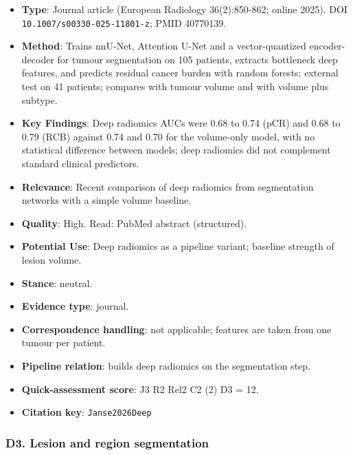 \documentclass[journal,onecolumn]{IEEEtran}
\begin{document}
\begin{itemize}

\item{} \textbf{Type}: Journal article (European Radiology 36(2):850-862; online 2025). DOI \nolinkurl{10.1007/s00330-025-11801-z}; PMID 40770139.

\item{} \textbf{Method}: Trains nnU-Net, Attention U-Net and a vector-quantized encoder-decoder for tumour segmentation on 105 patients, extracts bottleneck deep features, and predicts residual cancer burden with random forests; external test on 41 patients; compares with tumour volume and with volume plus subtype.

\item{} \textbf{Key Findings}: Deep radiomics AUCs were 0.68 to 0.74 (pCR) and 0.68 to 0.79 (RCB) against 0.74 and 0.70 for the volume-only model, with no statistical difference between models; deep radiomics did not complement standard clinical predictors.

\item{} \textbf{Relevance}: Recent comparison of deep radiomics from segmentation networks with a simple volume baseline.

\item{} \textbf{Quality}: High. Read: PubMed abstract (structured).

\item{} \textbf{Potential Use}: Deep radiomics as a pipeline variant; baseline strength of lesion volume.

\item{} \textbf{Stance}: neutral.

\item{} \textbf{Evidence type}: journal.

\item{} \textbf{Correspondence handling}: not applicable; features are taken from one tumour per patient.

\item{} \textbf{Pipeline relation}: builds deep radiomics on the segmentation step.

\item{} \textbf{Quick-assessment score}: J3 R2 Rel2 C2 (2) D3 = 12.

\item{} \textbf{Citation key}: \texttt{Janse2026Deep}

\end{itemize}

\subsubsection{D3. Lesion and region segmentation}
\end{document}
